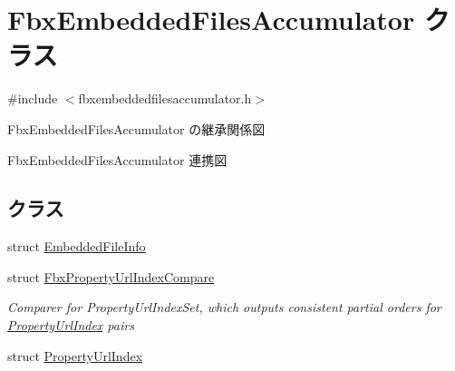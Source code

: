 \hypertarget{class_fbx_embedded_files_accumulator}{}\section{Fbx\+Embedded\+Files\+Accumulator クラス}
\label{class_fbx_embedded_files_accumulator}


{\ttfamily \#include $<$fbxembeddedfilesaccumulator.\+h$>$}



Fbx\+Embedded\+Files\+Accumulator の継承関係図


Fbx\+Embedded\+Files\+Accumulator 連携図
\subsection*{クラス}
\begin{DoxyCompactItemize}
\item 
struct \hyperlink{struct_fbx_embedded_files_accumulator_1_1_embedded_file_info}{Embedded\+File\+Info}
\item 
struct \hyperlink{struct_fbx_embedded_files_accumulator_1_1_fbx_property_url_index_compare}{Fbx\+Property\+Url\+Index\+Compare}
\begin{DoxyCompactList}\small\item\em Comparer for Property\+Url\+Index\+Set, which outputs consistent partial orders for \hyperlink{struct_fbx_embedded_files_accumulator_1_1_property_url_index}{Property\+Url\+Index} pairs \end{DoxyCompactList}\item 
struct \hyperlink{struct_fbx_embedded_files_accumulator_1_1_property_url_index}{Property\+Url\+Index}
\end{DoxyCompactItemize}
